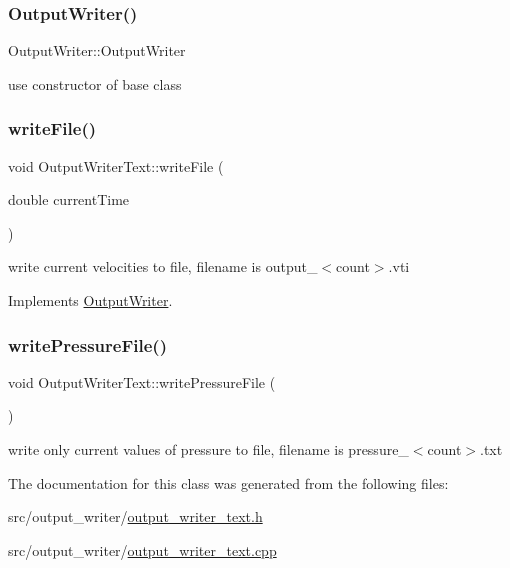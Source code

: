 \subsubsection{\texorpdfstring{OutputWriter()}{OutputWriter()}}
{\footnotesize\ttfamily Output\+Writer\+::\+Output\+Writer}



use constructor of base class 

\mbox{\label{classOutputWriterText_a25a12ea2524fc34e9acb19ef1f4c7431}} 
\subsubsection{\texorpdfstring{writeFile()}{writeFile()}}
{\footnotesize\ttfamily void Output\+Writer\+Text\+::write\+File (\begin{DoxyParamCaption}\item[{double}]{current\+Time }\end{DoxyParamCaption})\hspace{0.3cm}{\ttfamily [virtual]}}



write current velocities to file, filename is output\+\_\+$<$count$>$.\+vti 



Implements \mbox{\hyperlink{classOutputWriter_ac625c204affdc05919388a3549c2e945}{Output\+Writer}}.

\mbox{\label{classOutputWriterText_a3480b58a23fd158f16d0ef9c1b67cbfd}} 
\subsubsection{\texorpdfstring{writePressureFile()}{writePressureFile()}}
{\footnotesize\ttfamily void Output\+Writer\+Text\+::write\+Pressure\+File (\begin{DoxyParamCaption}{ }\end{DoxyParamCaption})}



write only current values of pressure to file, filename is pressure\+\_\+$<$count$>$.\+txt 



The documentation for this class was generated from the following files\+:\begin{DoxyCompactItemize}
\item 
src/output\+\_\+writer/\mbox{\hyperlink{output__writer__text_8h}{output\+\_\+writer\+\_\+text.\+h}}\item 
src/output\+\_\+writer/\mbox{\hyperlink{output__writer__text_8cpp}{output\+\_\+writer\+\_\+text.\+cpp}}\end{DoxyCompactItemize}
